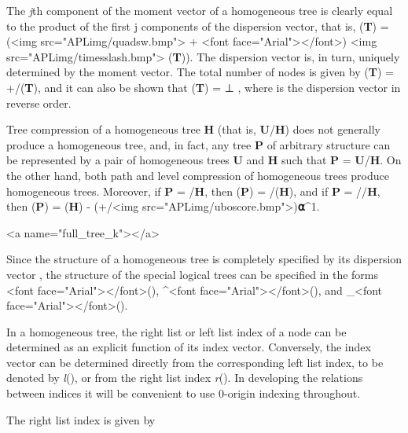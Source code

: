 {\par The \textit{j}th component of the moment vector of a homogeneous tree is clearly equal to the product of the first j components of the dispersion vector, that is, 
\textbf{\mu}(\textbf{T}) = (<img src="APLimg/quadsw.bmp"> + <font face="Arial"></font>) 
<img src="APLimg/timesslash.bmp"> \textbf{\nu}(\textbf{T})). The dispersion vector is, in turn, uniquely determined by the moment vector. The total number of nodes is given by 
\textit{\mu}(\textbf{T}) = +/\textbf{\mu}(\textbf{T}), and it can also be shown that 
\textit{\mu}(\textbf{T}) = 
 ⊥ , where  is the dispersion vector in reverse order.

\par Tree compression of a homogeneous tree \textbf{H} (that is, \textbf{U}/\textbf{H}) does not generally produce a homogeneous tree, and, in fact, any tree \textbf{P} of arbitrary structure can be represented by a pair of homogeneous trees \textbf{U} and \textbf{H} such that \textbf{P} = \textbf{U}/\textbf{H}. On the other hand, both path and level compression of homogeneous trees produce homogeneous trees. Moreover, if \textbf{P} = /\textbf{H}, then 
\textbf{\nu}(\textbf{P}) = /\textbf{\nu}(\textbf{H}), and if 
\textbf{P} = //\textbf{H}, then 
\textbf{\nu}(\textbf{P}) = \textbf{\nu}(\textbf{H}) - (+/<img src="APLimg/uboscore.bmp">)\textbf{⍺}^{1}.

<a name="full_tree_k"></a>
\par Since the structure of a homogeneous tree is completely specified by its dispersion vector , the structure of the special logical trees can be specified in the forms 
<font face="Arial"></font>(), 
^{}<font face="Arial"></font>(), and 
_{}<font face="Arial"></font>().

\par In a homogeneous tree, the right list or left list index of a node can be determined as an explicit function of its index vector. Conversely, the index vector  can be determined directly from the corresponding left list index, to be denoted by \textit{l}(), or from the right list index \textit{r}(). In developing the relations between indices it will be convenient to use 0-origin indexing throughout.

\par The right list index is given by

}
